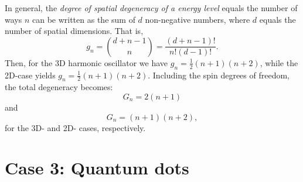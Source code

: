 In general, the \emph{degree of spatial degeneracy of a energy level} equals the number of ways $n$ can be written as the sum of $d$ non-negative numbers, where $d$ equals the number of spatial dimensions\cite{Baker1956}. That is,
\begin{equation}\label{gn}
\boxed{g_n  = \binom{d + n -1}{n} = \frac{(d + n - 1)!}{n!(d - 1)!}.}
\end{equation}
Then, for the 3D harmonic oscillator we have $g_n  = \frac{1}{2}(n+1)(n+2)$, while the 2D-case yields $g_n  = \frac{1}{2}(n+1)(n+2)$. Including the spin degrees of freedom, the total degeneracy becomes:
\begin{equation}\label{Gn3D}
 \boxed{G_n = 2(n+1)}
\end{equation}
and
\begin{equation}\label{Gn2D}
\boxed{G_n = (n+1)(n+2),}
\end{equation}
for the 3D- and 2D- cases, respectively.


\section{Case 3: Quantum dots}

